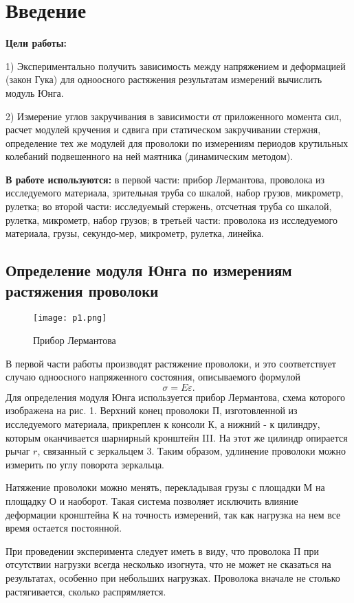 \section{Введение}

\textbf{Цели работы:}

1) Экспериментально получить зависимость между напряжением
и деформацией (закон Гука) для одноосного растяжения
результатам измерений вычислить модуль Юнга.

2) Измерение углов закручивания в зависимости от приложенного
момента сил, расчет модулей кручения и сдвига при
статическом закручивании стержня, определение тех же модулей
для проволоки по измерениям периодов крутильных колебаний
подвешенного на ней маятника (динамическим методом).

\textbf{В работе используются:}
в первой части: прибор Лермантова, проволока из исследуемого
материала, зрительная труба со шкалой, набор грузов,
микрометр, рулетка; во второй части: исследуемый стержень,
отсчетная труба со шкалой, рулетка, микрометр, набор грузов;
в третьей части: проволока из исследуемого материала, грузы,
секундо-мер, микрометр, рулетка, линейка.

\subsection{Определение модуля Юнга по измерениям растяжения проволоки}
\begin{figure}[H]
    \centering
\texttt{[image: p1.png]}
    \caption{Прибор Лермантова}
    \label{fig:my_label}
\end{figure}
В первой части работы производят растяжение проволоки,
и это соответствует случаю одноосного напряженного состояния,
описываемого формулой
\[\sigma = E\varepsilon.\]
Для определения модуля Юнга используется прибор Лермантова,
схема которого изображена на рис. 1. Верхний конец проволоки
П, изготовленной из исследуемого материала, прикреплен к
консоли К, а нижний - к цилиндру, которым оканчивается
шарнирный кронштейн III. На этот же цилиндр опирается рычаг $r$,
связанный с зеркальцем 3. Таким образом, удлинение проволоки
можно измерить по углу поворота зеркальца.

Натяжение проволоки можно менять, перекладывая грузы с
площадки М на площадку О и наоборот. Такая система позволяет
исключить влияние деформации кронштейна К на точность
измерений, так как нагрузка на нем все время остается
постоянной.

При проведении эксперимента следует иметь в виду, что проволока
П при отсутствии нагрузки всегда несколько изогнута, что не может не сказаться на результатах, особенно при небольших нагрузках. Проволока вначале не столько растягивается, сколько распрямляется.


